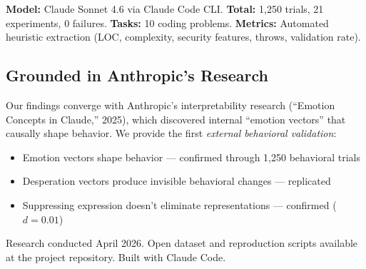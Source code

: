 \documentclass[10.5pt, a4paper]{article}
\begin{document}
{\small
\textbf{Model:} Claude Sonnet 4.6 via Claude Code CLI.
\textbf{Total:} 1{,}250 trials, 21 experiments, 0 failures.
\textbf{Tasks:} 10 coding problems.
\textbf{Metrics:} Automated heuristic extraction (LOC, complexity, security features, throws, validation rate).}

\subsection*{Grounded in Anthropic's Research}

{\small Our findings converge with Anthropic's interpretability research (``Emotion Concepts in Claude,'' 2025), which discovered internal ``emotion vectors'' that causally shape behavior. We provide the first \emph{external behavioral validation}:}

\begin{itemize}[leftmargin=1em, itemsep=1pt]
  \item {\small Emotion vectors shape behavior --- confirmed through 1{,}250 behavioral trials}
  \item {\small Desperation vectors produce invisible behavioral changes --- replicated}
  \item {\small Suppressing expression doesn't eliminate representations --- confirmed ($d = 0.01$)}
\end{itemize}

\vfill
{\footnotesize\color{muted} Research conducted April 2026. Open dataset and reproduction scripts available at the project repository. Built with Claude Code.}
\end{document}
